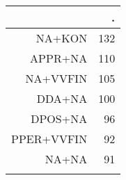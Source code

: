 \begin{tabular}{rr}
  \lsptoprule
 & . \\ 
  \midrule
NA+KON & 132 \\ 
  APPR+NA & 110 \\ 
  NA+VVFIN & 105 \\ 
  DDA+NA & 100 \\ 
  DPOS+NA &  96 \\ 
  PPER+VVFIN &  92 \\ 
  NA+NA &  91 \\ 
   \lspbottomrule
\end{tabular}
